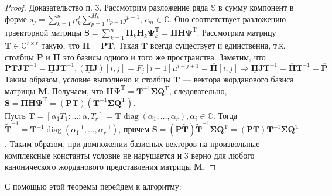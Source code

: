 \documentclass[specialist, substylefile = spbureport.rtx, subf,href,colorlinks=true, 12pt]{disser}
\theoremstyle{definition}
\DeclareMathOperator{\diag}{diag}
\begin{document}
\begin{proof}
Доказательство п. 3. Рассмотрим разложение ряда $\mathbb{S}$ в сумму компонент в форме $s_j = \sum_{k = 1}^{n} \mu_k^j \sum_{p = 1}^{M_k} c_{p - 1}j^{p - 1}$, $c_m \in \mathbb{C}$. Оно соответствует разложению траекторной матрицы $\mathbf{S} = \sum_{k = 1}^{n}\mathbf{\Pi}_k\mathbf{H}_k \mathbf{\Psi}_k^{\mathrm{T}} = \mathbf{\Pi H\Psi}^{\mathrm{T}}$. Рассмотрим матрицу $\mathbf{T} \in \mathbb{C}^{r \times r}$ такую, что $\mathbf{\Pi} = \mathbf{PT}$. Такая $\mathbf{T}$ всегда существует и единственна, т.к. столбцы $\mathbf{P}$ и $\mathbf{\Pi}$ это базисы одного и того же пространства. Заметим, что
\begin{equation*}
   \underline{\mathbf{P}}\mathbf{TJ}\mathbf{T}^{-1}
   = \underline{\mathbf{\Pi}}\mathbf{JT}^{-1},
   ( \underline{\mathbf{\Pi}}\mathbf{J})[i, j] = F_j[i + 1]\mu^{i - j + 1} = \overline{\mathbf{\Pi}}[i, j] \Rightarrow
\underline{\mathbf{\Pi}}\mathbf{JT}^{-1} =    \overline{\mathbf{\Pi}}\mathbf{T}^{-1} = \overline{\mathbf{P}}
\end{equation*}
Таким образом, условие выполнено и столбцы $\mathbf{T}$ --- вектора жорданового базиса матрицы $\mathbf{M}$.
Получаем, что $\mathbf{H\Psi}^{\mathrm{T}} = \mathbf{T}^{-1}\mathbf{\Sigma Q}^{\mathrm{T}}$, следовательно, $\mathbf{S} = \mathbf{\Pi H\Psi}^{\mathrm{T}} = (\mathbf{PT})(\mathbf{T}^{-1}\mathbf{\Sigma Q}^{\mathrm{T}})$. \\
\hspace*{0.5cm} Пусть $\widetilde{\mathbf{T}} = [\alpha_1T_1: \dots :\alpha_rT_r] = \mathbf{T}\diag (\alpha_1, \dots ,\alpha_r), \alpha_i \in \mathbb{C}$. Тогда\\ $\widetilde{\mathbf{T}}^{-1} = \mathbf{T}^{-1}\diag (\alpha_1^{-1}, \dots ,\alpha_r^{-1})$, причем $\mathbf{S} = (\mathbf{P}\widetilde{\mathbf{T}})\widetilde{\mathbf{T}}^{-1}\mathbf{\Sigma Q}^{\mathrm{T}} = (\mathbf{P}\mathbf{T})\mathbf{T}^{-1}\mathbf{\Sigma Q}^{\mathrm{T}}$. Таким образом, при домножении базисных векторов
на произвольные комплексные константы условие не нарушается и 3
верно для любого канонического жорданового представления матрицы $\mathbf{M}$.
\end{proof}

С помощью этой теоремы перейдем к алгоритму:
\end{document}
